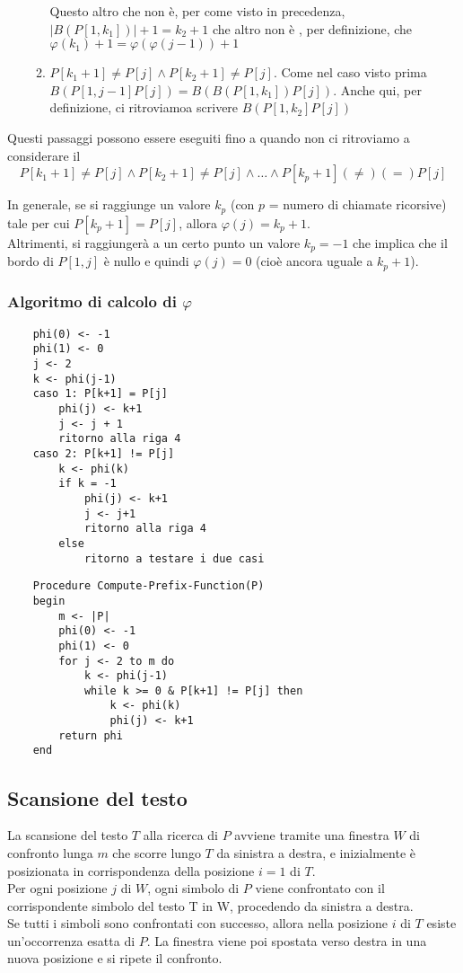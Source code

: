 \begin{itemize}
\begin{enumerate}
            Questo altro che non è, per come visto in precedenza, $|B(P[1, k_1])| + 1 = k_2 + 1$ che altro non è , per definizione, che $\varphi(k_1) +1 = \varphi(\varphi(j - 1)) +1$
            \item $P[k_1 + 1] \neq P[j] \land P[k_2 + 1] \neq P[j]$. Come nel caso visto prima $B(P[1, j-1] P[j]) = B(B(P[1, k_1]) P[j])$. Anche qui, per definizione, ci ritroviamoa  scrivere $B(P[1, k_2] P[j])$
        \end{enumerate}
\end{itemize}
Questi passaggi possono essere eseguiti fino a quando non ci ritroviamo a considerare il \[P[k_1 + 1] \neq P[j] \land P[k_2 + 1] \neq P[j] \land \dots \land P[k_{p}+1] (\neq)(=) P[j]\]

In generale, se si raggiunge un valore $k_p$ (con $p$ = numero di chiamate ricorsive) tale per cui $P[k_p + 1] = P[j]$, allora $\varphi(j) = k_p +1$.\\
Altrimenti, si raggiungerà a un certo punto un valore $k_p = -1$ che implica che il bordo di $P[1, j]$ è nullo e quindi $\varphi(j) = 0$ (cioè ancora uguale a $k_p +1$).

\subsubsection{Algoritmo di calcolo di \texorpdfstring{$\varphi$}{}}

\begin{lstlisting}
    phi(0) <- -1
    phi(1) <- 0
    j <- 2
    k <- phi(j-1)
    caso 1: P[k+1] = P[j]
	    phi(j) <- k+1
        j <- j + 1
        ritorno alla riga 4
    caso 2: P[k+1] != P[j]
        k <- phi(k)
        if k = -1
            phi(j) <- k+1
            j <- j+1
            ritorno alla riga 4
        else
        	ritorno a testare i due casi
\end{lstlisting}

\begin{lstlisting}
    Procedure Compute-Prefix-Function(P)
    begin
        m <- |P|
        phi(0) <- -1
        phi(1) <- 0
        for j <- 2 to m do
            k <- phi(j-1)
            while k >= 0 & P[k+1] != P[j] then
                k <- phi(k)
                phi(j) <- k+1
        return phi
    end
\end{lstlisting}


\subsection{Scansione del testo}
La scansione del testo $T$ alla ricerca di $P$ avviene tramite una finestra $W$ di confronto lunga $m$ che scorre lungo $T$ da sinistra a destra, e inizialmente è posizionata in corrispondenza della posizione $i=1$ di $T$.\\
Per ogni posizione $j$ di $W$, ogni simbolo di $P$ viene confrontato con il corrispondente simbolo del testo T in W, procedendo da sinistra a destra. \\
Se tutti i simboli sono confrontati con successo, allora nella posizione $i$ di $T$ esiste un’occorrenza esatta di $P$. La finestra viene poi spostata verso destra in una nuova posizione e si ripete il confronto.\\

